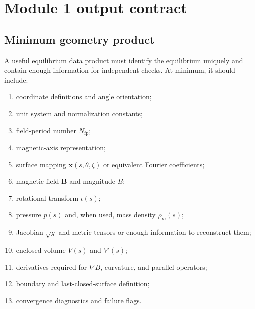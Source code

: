 \section{Module 1 output contract}
\label{sec:outputs}

\subsection{Minimum geometry product}
A useful equilibrium data product must identify the equilibrium uniquely and contain enough information for independent checks. At minimum, it should include:
\begin{enumerate}[leftmargin=1.6em]
\item coordinate definitions and angle orientation;
\item unit system and normalization constants;
\item field-period number $N_{\mathrm{fp}}$;
\item magnetic-axis representation;
\item surface mapping $\mathbf x(s,\theta,\zeta)$ or equivalent Fourier coefficients;
\item magnetic field $\mathbf B$ and magnitude $B$;
\item rotational transform $\iota(s)$;
\item pressure $p(s)$ and, when used, mass density $\rho_m(s)$;
\item Jacobian $\sqrt g$ and metric tensors or enough information to reconstruct them;
\item enclosed volume $V(s)$ and $V'(s)$;
\item derivatives required for $\nabla B$, curvature, and parallel operators;
\item boundary and last-closed-surface definition;
\item convergence diagnostics and failure flags.
\end{enumerate}

